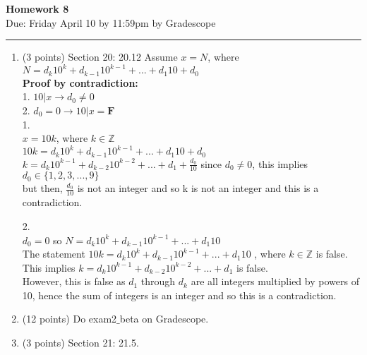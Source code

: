 \documentclass[12pt]{article}
\begin{document}
\begin{center}
  \textbf{\Large Homework 8} \\
Due: Friday April 10 by 11:59pm 
by Gradescope
\end{center}


\hrule

\vspace{0.25in}

\begin{enumerate}
    \item (3 points) Section 20:  20.12
    Assume $x = N$, where $N= d_k10^{k} +d_{k-1}10^{k-1}+...+d_1 10 + d_0 $\\
    \textbf{Proof by contradiction: }\\
    1. $10|x \rightarrow d_0 \neq 0$\\
    2. $d_0 = 0 \rightarrow 10|x = \textbf{F}$\\
    
    1. \\
    $x=10k$, where $k \in \mathbb{Z}$\\
    $10k = d_k10^{k} +d_{k-1}10^{k-1}+...+d_1 10 + d_0 $\\
    $k = d_k10^{k-1} +d_{k-2}10^{k-2}+...+d_1 + \frac{d_0}{10} $
    since $d_0 \neq 0$, this implies $d_0 \in \{1,2,3,...,9\}$ \\
    but then, $\frac{d_0}{10}$ is not an integer and so k is not an integer and this is a contradiction.
    
    2. \\
    $d_0 = 0$ so $N= d_k10^{k} +d_{k-1}10^{k-1}+...+d_1 10 $ \\
    The statement $10k = d_k10^{k} +d_{k-1}10^{k-1}+...+d_1 10 $ , where $k \in \mathbb{Z}$ is false. \\
    This implies $k = d_k10^{k-1} +d_{k-2}10^{k-2}+...+d_1 $ is false. \\
    However, this is false as $d_1$ through $d_k$ are all integers multiplied by powers of 10, hence the sum of integers is an integer and so this is a contradiction.
    
    
    \item (12 points) Do exam2$\_$beta on Gradescope.  
   
    \item (3 points)  Section 21:  21.5. 
    

\end{enumerate}
\end{document}
